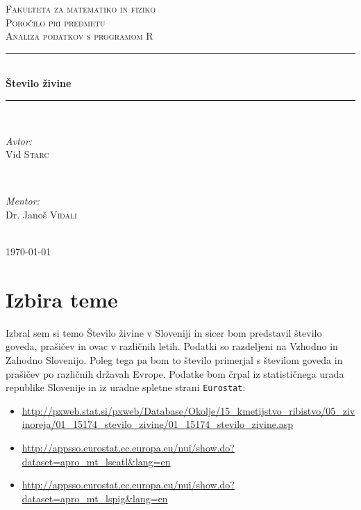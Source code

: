 \documentclass[11pt,a4paper]{article}
\begin{document}
\begin{titlepage}
\newcommand{\HRule}{\rule{\linewidth}{0.5mm}}
\center

\textsc{\LARGE Fakulteta za matematiko in fiziko}\\[3 cm]
\textsc{\Large Poročilo pri predmetu}\\[0.5cm]
\textsc{\large Analiza podatkov s programom R}\\[2 cm]
\HRule \\[0.4cm]
{ \huge \bfseries Število živine}\\[0.4cm] 
\HRule \\[6 cm]


\begin{minipage}{0.4\textwidth}
\begin{flushleft} \large
\emph{Avtor:}\\
Vid \textsc{Starc}
\end{flushleft}
\end{minipage}
~
\begin{minipage}{0.4\textwidth}
\begin{flushright} \large
\emph{Mentor:} \\
Dr. Janoš \textsc{Vidali}
\end{flushright}
\end{minipage}\\[2 cm]

{\large \today}\\[3cm] 


\end{titlepage}


\section{Izbira teme}
Izbral sem si temo Število živine v Sloveniji in sicer bom predstavil število goveda, prašičev in ovac v različnih letih. Podatki so razdeljeni na Vzhodno in Zahodno Slovenijo. Poleg tega pa bom to število primerjal s številom goveda in prašičev po različnih državah Evrope. Podatke bom črpal iz statističnega urada republike Slovenije in iz uradne spletne strani \verb|Eurostat|:
\begin{itemize}
\item \url{http://pxweb.stat.si/pxweb/Database/Okolje/15_kmetijstvo_ribistvo/05_zivinoreja/01_15174_stevilo_zivine/01_15174_stevilo_zivine.asp}

\item \url{http://appsso.eurostat.ec.europa.eu/nui/show.do?dataset=apro_mt_lscatl&lang=en}

\item \url{http://appsso.eurostat.ec.europa.eu/nui/show.do?dataset=apro_mt_lspig&lang=en}
\end{itemize}
\end{document}
